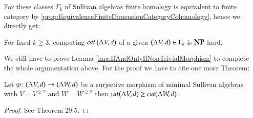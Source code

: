   For these classes $\Gamma_k$ of Sullivan algebras finite homology is equivalent to finite 
  category by \ref{prop:EquivalenceFiniteDimensionCategoryCohomology}, hence we directly get:
  
  \begin{Corollary}
   For fixed $k \geq 3$, computing $cat \, (\Lambda V,d)$ of a given $(\Lambda V,d) \in \Gamma_k$ is $\mathbf{NP}$-hard.
  \end{Corollary}

  
  We still have to prove Lemma \ref{lma:IfAndOnlyIfNonTrivialMorphism} to complete the whole argumentation above. For the proof
  we have to cite one more Theorem:
  
  \begin{Theorem}
  \label{thm:MappingTheorem}
   Let $\varphi \colon (\Lambda V,d) \to (\Lambda W,d)$ be a surjective morphism of minimal Sullivan algebras with $V = V^{\geq 2}$
   and $W = W^{\geq 2}$ then $cat (\Lambda V,d) \geq cat(\Lambda W,d)$.
  \end{Theorem}
  \begin{proof}
   See \cite{Felix2001} Theorem 29.5.
  \end{proof}

  
  

